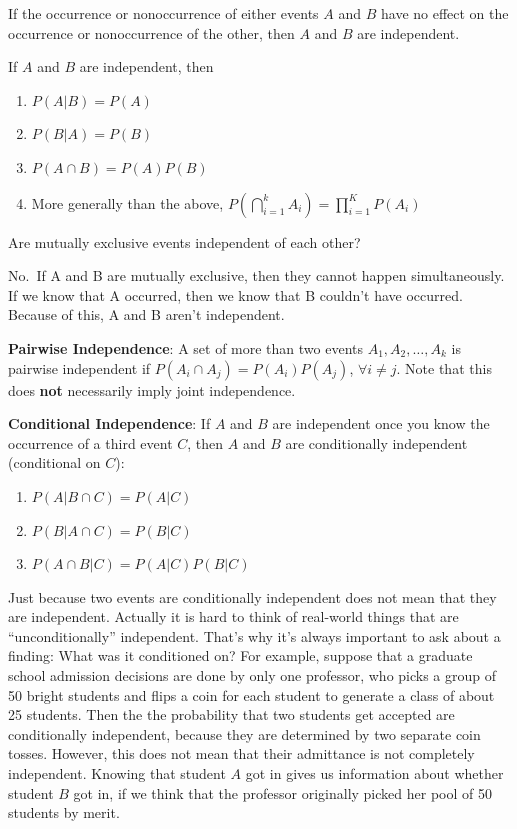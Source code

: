 \documentclass[
]{book}
\begin{document}
\begin{definition}[Independence]
\protect\hypertarget{def:unnamed-chunk-70}{}\label{def:unnamed-chunk-70}If the occurrence or nonoccurrence of either events \(A\) and \(B\) have no effect on the occurrence or nonoccurrence of the other, then \(A\) and \(B\) are independent.
\end{definition}

If \(A\) and \(B\) are independent, then

\begin{enumerate}
\def\labelenumi{\arabic{enumi}.}
\tightlist
\item
  \(P(A|B)=P(A)\)
\item
  \(P(B|A)=P(B)\)
\item
  \(P(A\cap B)=P(A)P(B)\)
\item
  More generally than the above, \(P(\bigcap_{i=1}^k A_i) = \prod_{i = 1}^K P(A_i)\)
\end{enumerate}

Are mutually exclusive events independent of each other?

No.~If A and B are mutually exclusive, then they cannot happen simultaneously. If we know that A occurred, then we know that B couldn't have occurred. Because of this, A and B aren't independent.

\textbf{Pairwise Independence}: A set of more than two events \(A_1, A_2, \dots, A_k\) is pairwise independent if \(P(A_i\cap A_j)=P(A_i)P(A_j)\), \(\forall i\neq j\). Note that this does \textbf{not} necessarily imply joint independence.

\textbf{Conditional Independence}: If \(A\) and \(B\) are independent once you know the occurrence of a third event \(C\), then \(A\) and \(B\) are conditionally independent (conditional on \(C\)):

\begin{enumerate}
\def\labelenumi{\arabic{enumi}.}
\tightlist
\item
  \(P(A|B \cap C)=P(A|C)\)
\item
  \(P(B|A \cap C)=P(B|C)\)
\item
  \(P(A\cap B|C)=P(A|C)P(B|C)\)
\end{enumerate}

Just because two events are conditionally independent does not mean that they are independent. Actually it is hard to think of real-world things that are ``unconditionally'' independent. That's why it's always important to ask about a finding: What was it conditioned on? For example, suppose that a graduate school admission decisions are done by only one professor, who picks a group of 50 bright students and flips a coin for each student to generate a class of about 25 students. Then the the probability that two students get accepted are conditionally independent, because they are determined by two separate coin tosses. However, this does not mean that their admittance is not completely independent. Knowing that student \(A\) got in gives us information about whether student \(B\) got in, if we think that the professor originally picked her pool of 50 students by merit.
\end{document}

